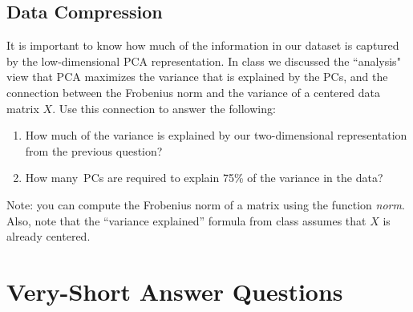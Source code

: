 \documentclass{article}
\def\blu#1{{\color{blu}#1}}
\def\enum#1{\begin{enumerate}#1\end{enumerate}}
\begin{document}
\pagebreak

\subsection{Data Compression}

It is important to know how much of the information in our dataset is captured by the low-dimensional PCA representation.
In class we discussed the ``analysis" view that PCA maximizes the variance that is explained by the PCs, and the connection between the Frobenius norm and the variance of a centered data matrix $X$. Use this connection to answer the following:
\blu{\enum{
\item How much of the variance is explained by our two-dimensional representation from the previous question?
\item How many\ PCs are required to explain 75\% of the variance in the data?
}}
Note: you can compute the Frobenius norm of a matrix using the function \emph{norm}. Also, note that the ``variance explained'' formula from class assumes that $X$ is already centered.


\pagebreak

\section{Very-Short Answer Questions}
\end{document}
